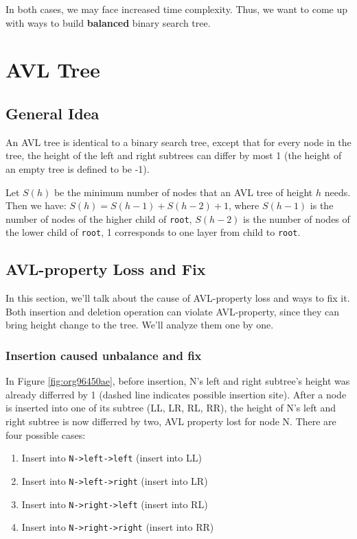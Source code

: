 \documentclass[11pt]{book}
\begin{document}
In both cases, we may face increased time complexity. Thus, we want to come up with ways to build \textbf{balanced} binary search tree.

\section{AVL Tree}
\label{sec:org55f5f7a}
\subsection{General Idea}
\label{sec:org35bc09b}
An AVL tree is identical to a binary search tree, except that for every node in the tree, the height of the left and right subtrees can differ by most 1 (the height of an empty tree is defined to be -1).

Let \(S(h)\) be the minimum number of nodes that an AVL tree of height \(h\) needs. Then we have: \(S(h) = S(h - 1) + S(h - 2) + 1\), where \(S(h - 1)\) is the number of nodes of the higher child of \texttt{root}, \(S(h - 2)\) is the number of nodes of the lower child of \texttt{root}, 1 corresponds to one layer from child to \texttt{root}.
\subsection{AVL-property Loss and Fix}
\label{sec:orge6b7ec6}
In this section, we'll talk about the cause of AVL-property loss and ways to fix it. Both insertion and deletion operation can violate AVL-property, since they can bring height change to the tree. We'll analyze them one by one.
\subsubsection{Insertion caused unbalance and fix}
\label{sec:org70b7661}
In Figure \ref{fig:org96450ae}, before insertion, N's left and right subtree's height was already differred by 1 (dashed line indicates possible insertion site). After a node is inserted into one of its subtree (LL, LR, RL, RR), the height of N's left and right subtree is now differred by two, AVL property lost for node N. There are four possible cases:
\begin{enumerate}
\item Insert into \texttt{N->left->left} (insert into LL)
\item Insert into \texttt{N->left->right} (insert into LR)
\item Insert into \texttt{N->right->left} (insert into RL)
\item Insert into \texttt{N->right->right} (insert into RR)
\end{enumerate}
\end{document}

